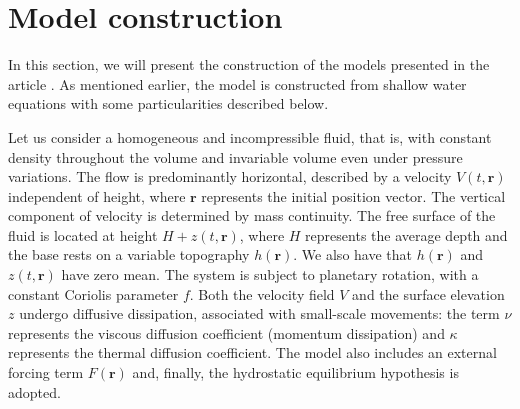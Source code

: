 \section{Model construction} \label{sec:ch01_model_construction}
In this section, we will present the construction of the models presented in the article \citet{Lorenz1980}. As mentioned earlier, the model is constructed from shallow water equations with some particularities described below.
 
Let us consider a homogeneous and incompressible fluid, that is, with constant density throughout the volume and invariable volume even under pressure variations. The flow is predominantly horizontal, described by a velocity $V(t, \mathbf{r})$ independent of height, where $\mathbf{r}$ represents the initial position vector.
The vertical component of velocity is determined by mass continuity. The free surface of the fluid is located at height $H + z(t, \mathbf{r})$, where $H$ represents the average depth and the base rests on a variable topography $h(\mathbf{r})$. We also have that $h(\mathbf{r})$ and $z(t, \mathbf{r})$ have zero mean.
The system is subject to planetary rotation, with a constant Coriolis parameter $f$.
Both the velocity field $V$ and the surface elevation $z$ undergo diffusive dissipation,
associated with small-scale movements: the term $\nu$ represents the viscous diffusion coefficient (momentum dissipation) and $\kappa$ represents the thermal diffusion coefficient. The model also includes an external forcing term $F(\mathbf{r})$ and, finally, the hydrostatic equilibrium hypothesis is adopted.

